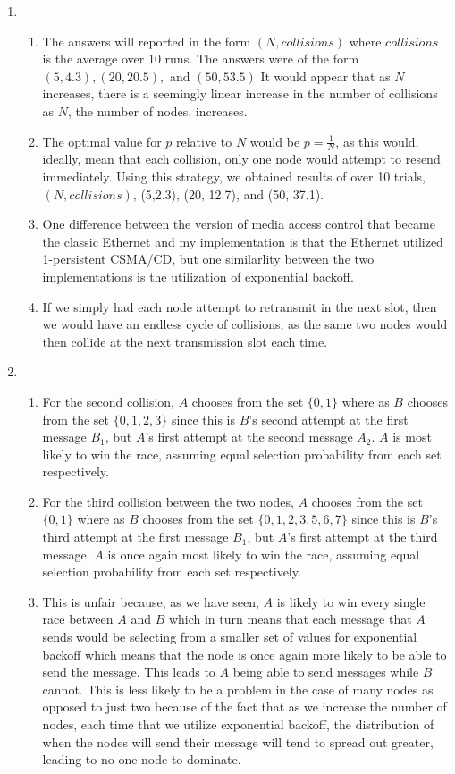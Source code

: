 \documentclass[10pt]{article}
\begin{document}
\begin{enumerate}
    \item \begin{enumerate}[label=(\alph*)] 
        \item The answers will reported in the form $(N, collisions)$ where $collisions$ is the average over 10 runs. The answers were of the form $(5, 4.3), (20,20.5),$ and $(50, 53.5)$ It would appear that as $N$ increases, there is a seemingly linear increase in the number of collisions as $N$, the number of nodes, increases.
        \item The optimal value for $p$ relative to $N$ would be $p = \frac{1}{N}$, as this would, ideally, mean that each collision, only one node would attempt to resend immediately. Using this strategy, we obtained results of over 10 trials, $(N, collisions)$, (5,2.3), (20, 12.7), and (50, 37.1).
        \item One difference between the version of media access control that became the classic Ethernet and my implementation is that the Ethernet utilized 1-persistent CSMA/CD, but one similarlity between the two implementations is the utilization of exponential backoff.
        \item If we simply had each node attempt to retransmit in the next slot, then we would have an endless cycle of collisions, as the same two nodes would then collide at the next transmission slot each time.
    \end{enumerate}
    \item \begin{enumerate}[label=(\alph*)] 
        \item For the second collision, $A$ chooses from the set $\{0, 1\}$ where as $B$ chooses from the set $\{0,1, 2, 3\}$ since this is $B$'s second attempt at the first message $B_1$, but $A$'s first attempt at the second message $A_2$. $A$ is most likely to win the race, assuming equal selection probability from each set respectively.
        \item For the third collision between the two nodes, $A$ chooses from the set $\{0, 1\}$ where as $B$ chooses from the set $\{0,1, 2, 3, 5, 6, 7\}$ since this is $B$'s third attempt at the first message $B_1$, but $A$'s first attempt at the third message. $A$ is once again most likely to win the race, assuming equal selection probability from each set respectively.
        \item This is unfair because, as we have seen, $A$ is likely to win every single race between $A$ and $B$ which in turn means that each message that $A$ sends would be selecting from a smaller set of values for exponential backoff which means that the node is once again more likely to be able to send the message. This leads to $A$ being able to send messages while $B$ cannot. This is less likely to be a problem in the case of many nodes as opposed to just two because of the fact that as we increase the number of nodes, each time that we utilize exponential backoff, the distribution of when the nodes will send their message will tend to spread out greater, leading to no one node to dominate.

\end{enumerate}
\end{enumerate}
\end{document}
